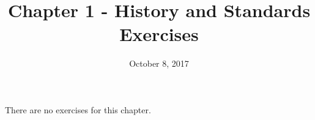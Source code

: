 \documentclass{article}
\title{Chapter 1 - History and Standards \\
Exercises}
\date{October 8, 2017}
\begin{document}
\maketitle
{}

There are no exercises for this chapter.
\end{document}
